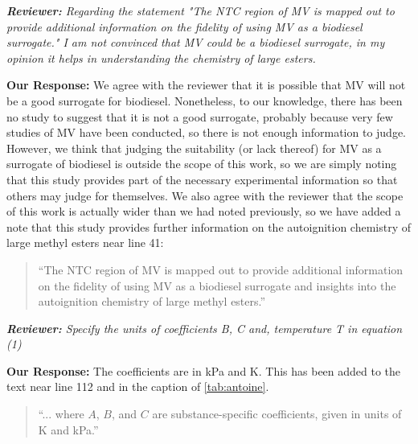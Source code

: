 \documentclass{article}
\newenvironment{reviewer}{\vspace{0.5\baselineskip}\begingroup\itshape\textbf{Reviewer:}}{\endgroup\vspace{0.5\baselineskip}}
\newenvironment{response}{\vspace{0.5\baselineskip}\textbf{Our Response:}}{\vspace{0.5\baselineskip}}
\begin{document}
\begin{reviewer}
    Regarding the statement "The NTC region of MV is mapped out to provide additional information on
    the fidelity of using MV as a biodiesel surrogate." I am not convinced that MV could be a
    biodiesel surrogate, in my opinion it helps in understanding the chemistry of large esters.
\end{reviewer}

\begin{response}
    We agree with the reviewer that it is possible that MV will not be a good surrogate for
    biodiesel. Nonetheless, to our knowledge, there has been no study to suggest that it is not a
    good surrogate, probably because very few studies of MV have been conducted, so there is not
    enough information to judge. However, we think that judging the suitability (or lack thereof)
    for MV as a surrogate of biodiesel is outside the scope of this work, so we are simply noting
    that this study provides part of the necessary experimental information so that others may judge
    for themselves. We also agree with the reviewer that the scope of this work is actually wider
    than we had noted previously, so we have added a note that this study provides further
    information on the autoignition chemistry of large methyl esters near line 41:

    \begin{quote}
        ``The NTC region of MV is mapped out to provide additional information on the fidelity of
        using MV as a biodiesel surrogate and insights into the autoignition chemistry of large
        methyl esters.''
    \end{quote}
\end{response}

\begin{reviewer}
    Specify the units of coefficients B, C  and, temperature T in equation (1)
\end{reviewer}

\begin{response}
    The coefficients are in \si{kPa} and \si{\kelvin}. This has been added to the text near line
    112 and in the caption of \cref{tab:antoine}.
    \begin{quote}
        ``... where \(A\), \(B\), and \(C\) are substance-specific coefficients, given in units of
        \si{\kelvin} and \si{\kPa}.''
    \end{quote}
\end{response}
\end{document}
